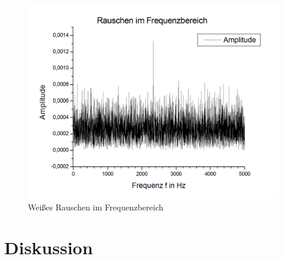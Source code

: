 \documentclass{scrartcl}						%
\begin{document}
			\begin{figure}[h!]
				\centering
				\includegraphics[scale=0.4]{A1c-Graph}
				\caption{Weißes Rauschen im Frequenzbereich}
			\end{figure}
	\clearpage

\section{Diskussion}
				
\end{document}
